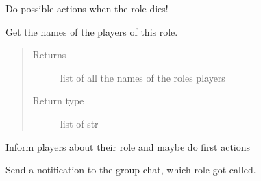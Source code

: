 \documentclass[letterpaper,10pt,english]{sphinxmanual}
\begin{document}
\begin{fulllineitems}
\begin{fulllineitems}
\begin{quote}
\begin{description}
\end{description}\end{quote}

\end{fulllineitems}



\begin{fulllineitems}
Do possible actions when the role dies!

\end{fulllineitems}



\begin{fulllineitems}
Get the names of the players of this role.
\begin{quote}\begin{description}
\item[{Returns}] \leavevmode
list of all the names of the roles players

\item[{Return type}] \leavevmode
list of str

\end{description}\end{quote}

\end{fulllineitems}



\begin{fulllineitems}
Inform players about their role and maybe do first actions

\end{fulllineitems}



\begin{fulllineitems}
\end{fulllineitems}



\begin{fulllineitems}
Send a notification to the group chat, which role got called.

\end{fulllineitems}



\begin{fulllineitems}
\end{fulllineitems}




\end{fulllineitems}
\end{document}
